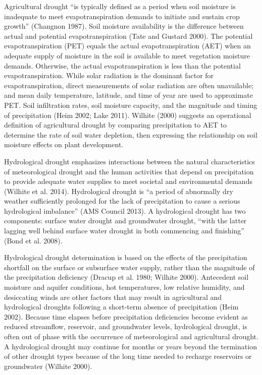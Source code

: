 \documentclass[12pt,twoside]{reedthesis}
\theoremstyle{definition}
\theoremstyle{definition}
\theoremstyle{definition}
\theoremstyle{remark}
\begin{document}
Agricultural drought ``is typically defined as a period when soil
moisture is inadequate to meet evapotranspiration demands to initiate
and sustain crop growth'' (Changnon 1987). Soil moisture availability is
the difference between actual and potential evapotranspiration (Tate and
Gustard 2000). The potential evapotranspiration (PET) equals the actual
evapotranspiration (AET) when an adequate supply of moisture in the soil
is available to meet vegetation moisture demands. Otherwise, the actual
evapotranspiration is less than the potential evapotranspiration. While
solar radiation is the dominant factor for evapotranspiration, direct
measurements of solar radiation are often unavailable; and mean daily
temperature, latitude, and time of year are used to approximate PET.
Soil infiltration rates, soil moisture capacity, and the magnitude and
timing of precipitation (Heim 2002; Lake 2011). Wilhite (2000) suggests
an operational definition of agricultural drought by comparing
precipitation to AET to determine the rate of soil water depletion, then
expressing the relationship on soil moisture effects on plant
development.

Hydrological drought emphasizes interactions between the natural
characteristics of meteorological drought and the human activities that
depend on precipitation to provide adequate water supplies to meet
societal and environmental demands (Wilhite et al. 2014). Hydrological
drought is ``a period of abnormally dry weather sufficiently prolonged
for the lack of precipitation to cause a serious hydrological
imbalance'' (AMS Council 2013). A hydrological drought has two
components: surface water drought and groundwater drought, ``with the
latter lagging well behind surface water drought in both commencing and
finishing'' (Bond et al. 2008).

Hydrological drought determination is based on the effects of the
precipitation shortfall on the surface or subsurface water supply,
rather than the magnitude of the precipitation deficiency (Dracup et al.
1980; Wilhite 2000). Antecedent soil moisture and aquifer conditions,
hot temperatures, low relative humidity, and desiccating winds are other
factors that may result in agricultural and hydrological droughts
following a short-term absence of precipitation (Heim 2002). Because
time elapses before precipitation deficiencies become evident as reduced
streamflow, reservoir, and groundwater levels, hydrological drought, is
often out of phase with the occurrence of meteorological and
agricultural drought. A hydrological drought may continue for months or
years beyond the termination of other drought types because of the long
time needed to recharge reservoirs or groundwater (Wilhite 2000).
\end{document}
